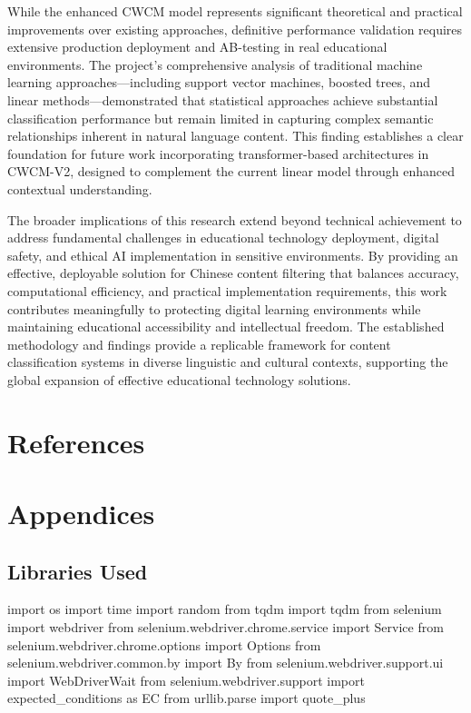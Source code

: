 \documentclass[
  titlepage]{article}
\begin{document}
While the enhanced CWCM model represents significant theoretical and
practical improvements over existing approaches, definitive performance
validation requires extensive production deployment and AB-testing in
real educational environments. The project's comprehensive analysis of
traditional machine learning approaches---including support vector
machines, boosted trees, and linear methods---demonstrated that
statistical approaches achieve substantial classification performance
but remain limited in capturing complex semantic relationships inherent
in natural language content. This finding establishes a clear foundation
for future work incorporating transformer-based architectures in
CWCM-V2, designed to complement the current linear model through
enhanced contextual understanding.

The broader implications of this research extend beyond technical
achievement to address fundamental challenges in educational technology
deployment, digital safety, and ethical AI implementation in sensitive
environments. By providing an effective, deployable solution for Chinese
content filtering that balances accuracy, computational efficiency, and
practical implementation requirements, this work contributes
meaningfully to protecting digital learning environments while
maintaining educational accessibility and intellectual freedom. The
established methodology and findings provide a replicable framework for
content classification systems in diverse linguistic and cultural
contexts, supporting the global expansion of effective educational
technology solutions.

\section*{References}\label{references}

\section*{Appendices}\label{appendices}

\subsection{Libraries Used}\label{libraries-used}

import os import time import random from tqdm import tqdm from selenium
import webdriver from selenium.webdriver.chrome.service import Service
from selenium.webdriver.chrome.options import Options from
selenium.webdriver.common.by import By from
selenium.webdriver.support.ui import WebDriverWait from
selenium.webdriver.support import expected\_conditions as EC from
urllib.parse import quote\_plus
\end{document}
